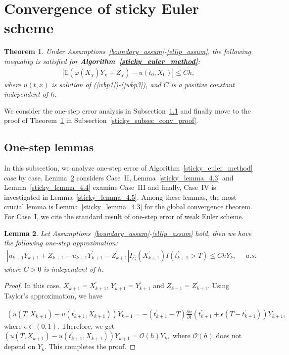 \documentclass{article}
\newtheorem{theorem}{Theorem}[section]
\newtheorem{lemma}[theorem]{Lemma}
\theoremstyle{definition}
\numberwithin{equation}{section}
\begin{document}
\section{Convergence of sticky Euler scheme} \label{sticky_conv_proof_sticky_euler}

\begin{theorem}\label{thrm_sticky_euler_conv}
Under Assumptions~\ref{boundary_assum}-\ref{ellip_assum}, the following inequality is satisfied for \textbf{Algorithm~\ref{sticky_euler_method}}:
\begin{align}
|\mathbb{E}( \varphi(X_{\chi})Y_{\chi} + Z_{\chi}) - u(t_{0}, X_{0})| \leq Ch, 
\end{align}
where $ u(t,x) $ is solution of (\ref{wbp1})-(\ref{wbp3}), and $C $ is a positive constant independent of $h$. 
\end{theorem}

We consider the one-step error analysis in Subsection~\ref{sticky_subsec_one_step_lemmas} and finally move to the proof of  Theorem~\ref{thrm_sticky_euler_conv} in Subsection~\ref{sticky_subsec_conv_proof}. 



\subsection{One-step lemmas}\label{sticky_subsec_one_step_lemmas}
In this subsection, we analyze one-step error of Algorithm~\ref{sticky_euler_method} case by case. Lemma~\ref{sticky_lemma_4.2} considers Case~II, Lemma~\ref{sticky_lemma_4.3} and Lemma~\ref{sticky_lemma_4.4} examine Case~III and finally, Case~IV is investigated in Lemma~\ref{sticky_lemma_4.5}. Among these lemmas, the most crucial lemma is Lemma~\ref{sticky_lemma_4.3} for the global convergence theorem. For Case~I, we cite the standard result of one-step error of weak Euler scheme. 

\begin{lemma}\label{sticky_lemma_4.2}
    Let Assumptions~\ref{boundary_assum}-\ref{ellip_assum} hold, then we have the following one-step approximation:
\begin{align*}
|u_{k+1}Y_{k+1} + Z_{k+1} - u_{k+1}^{'}Y_{k+1}^{'} - Z_{k+1}^{'}   |I_{\bar{G}}(X_{k+1}^{'})I(t^{'}_{k+1} > T) \leq ChY_{k},\;\;\;\;\;a.s. 
\end{align*}
where $C > 0$ is independent of $h$. 
\end{lemma}
\begin{proof}
    In this case, $X_{k+1} = X_{k+1}^{'}$, $Y_{k+1} = Y_{k+1}^{'}$ and $Z_{k+1} = Z_{k+1}^{'}$. Using Taylor's approximation, we have

\begin{align}
    (u(T, X_{k+1}) - u(t_{k+1}^{'}, X_{k+1})) Y_{k+1} =  -(t_{k+1}^{'} - T)\frac{\partial u}{\partial t}(t_{k+1}^{'} + \epsilon (T-t_{k+1}^{'}))Y_{k+1},
\end{align}
where $\epsilon \in (0,1)$. Therefore, we get
$
     (u(T, X_{k+1}) - u(t_{k+1}^{'}, X_{k+1})) Y_{k+1} = \mathcal{O}(h)Y_{k},
$
where $\mathcal{O}(h)$ does not depend on $Y_{k}$. This completes the proof. 
\end{proof}
\end{document}
